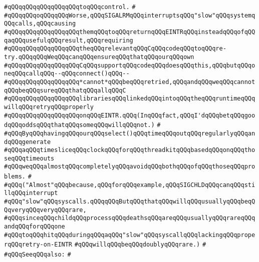 \verb|#qQQqqQQqqQQqqQQqqQQqtoqQQqcontrol.|\newline
\verb|#|\newline
\verb|#qQQqqQQqoqQQqqQQqWorse,qQQqSIGALRMqQQqinterruptsqQQq"slow"qQQqsystemqQQqcalls,qQQqcausing|\newline
\verb|#qQQqqQQqqQQqqQQqqQQqthemqQQqtoqQQqreturnqQQqEINTRqQQqinsteadqQQqofqQQqaqQQqusefulqQQqresult,qQQqrequiring|\newline
\verb|#qQQqqQQqqQQqqQQqqQQqtheqQQqrelevantqQQqCqQQqcodeqQQqtoqQQqre-try.qQQqqQQqWeqQQqcanqQQqensureqQQqthatqQQqourqQQqown|\newline
\verb|#qQQqqQQqqQQqqQQqqQQqCqQQqsupportqQQqcodeqQQqdoesqQQqthis,qQQqbutqQQqoneqQQqcallqQQq--qQQqconnect()qQQq--|\newline
\verb|#qQQqqQQqqQQqqQQqqQQq*cannot*qQQqbeqQQqretried,qQQqandqQQqweqQQqcannotqQQqbeqQQqsureqQQqthatqQQqallqQQqC|\newline
\verb|#qQQqqQQqqQQqqQQqqQQqlibrariesqQQqlinkedqQQqintoqQQqtheqQQqruntimeqQQqwillqQQqretryqQQqproperly|\newline
\verb|#qQQqqQQqqQQqqQQqqQQqonqQQqEINTR.qQQq(InqQQqfact,qQQqI'dqQQqbetqQQqgoodqQQqoddsqQQqthatqQQqsomeqQQqwillqQQqnot.)|\newline
\verb|#|\newline
\verb|#qQQqByqQQqhavingqQQqourqQQqselect()qQQqtimeqQQqoutqQQqregularlyqQQqandqQQqgenerate|\newline
\verb|#qQQqaqQQqtimesliceqQQqclockqQQqforqQQqthreadkitqQQqbasedqQQqonqQQqthoseqQQqtimeouts|\newline
\verb|#qQQqweqQQqalmostqQQqcompletelyqQQqavoidqQQqbothqQQqofqQQqthoseqQQqproblems.|\newline
\verb|#|\newline
\verb|#qQQq("Almost"qQQqbecause,qQQqforqQQqexample,qQQqSIGCHLDqQQqcanqQQqstillqQQqinterrupt|\newline
\verb|#qQQq"slow"qQQqsyscalls.qQQqqQQqButqQQqthatqQQqwillqQQqusuallyqQQqbeqQQqveryqQQqveryqQQqrare,|\newline
\verb|#qQQqsinceqQQqchildqQQqprocessqQQqdeathsqQQqareqQQqusuallyqQQqrareqQQqandqQQqforqQQqone|\newline
\verb|#qQQqtoqQQqhitqQQqduringqQQqaqQQq"slow"qQQqsyscallqQQqlackingqQQqproperqQQqretry-on-EINTR|\newline
\verb|#qQQqwillqQQqbeqQQqdoublyqQQqrare.)|\newline
\verb|#|\newline
\verb|#qQQqSeeqQQqalso:|\newline
\verb|#|\newline
